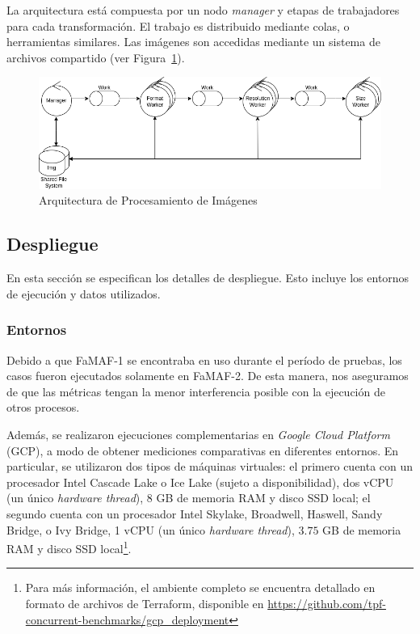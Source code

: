 \documentclass[11pt]{article}
\let\Oldsubsection\subsection
\renewcommand{\subsection}{\FloatBarrier\Oldsubsection}
\let\Oldsubsubsection\subsubsection
\renewcommand{\subsubsection}{\FloatBarrier\Oldsubsubsection}
\newcommand{\english}[1]{\textit{#1}}
\begin{document}
La arquitectura está compuesta por un nodo \english{manager} y etapas de trabajadores para cada transformación. El trabajo es distribuido mediante colas, o herramientas similares. Las imágenes son accedidas mediante un sistema de archivos compartido (ver Figura~\ref{fig:sis_dist:image_processing_arch}).

\begin{figure}[h]
    \centering
    \includegraphics[scale=0.5]{resources/distributed_systems/image_processing_arch.png}
    \caption{Arquitectura de Procesamiento de Imágenes}
    \label{fig:sis_dist:image_processing_arch}
\end{figure}

\newpage

\subsection{Despliegue}

En esta sección se especifican los detalles de despliegue. Esto incluye los entornos de ejecución y datos utilizados.

\subsubsection{Entornos}

Debido a que FaMAF-1 se encontraba en uso durante el período de pruebas, los casos fueron ejecutados solamente en FaMAF-2. De esta manera, nos aseguramos de que las métricas tengan la menor interferencia posible con la ejecución de otros procesos.

Además, se realizaron ejecuciones complementarias en \english{Google Cloud Platform} (GCP), a modo de obtener mediciones comparativas en diferentes entornos. En particular, se utilizaron dos tipos de máquinas virtuales: el primero cuenta con un procesador Intel Cascade Lake o Ice Lake (sujeto a disponibilidad), dos vCPU (un único \english{hardware thread}), 8 GB de memoria RAM y disco SSD local; el segundo cuenta con un procesador Intel Skylake, Broadwell, Haswell, Sandy Bridge, o Ivy Bridge, 1 vCPU (un único \english{hardware thread}), $3.75$ GB de memoria RAM y disco SSD local\footnote{Para más información, el ambiente completo se encuentra detallado en formato de archivos de Terraform, disponible en \url{https://github.com/tpf-concurrent-benchmarks/gcp_deployment}}.
\end{document}
